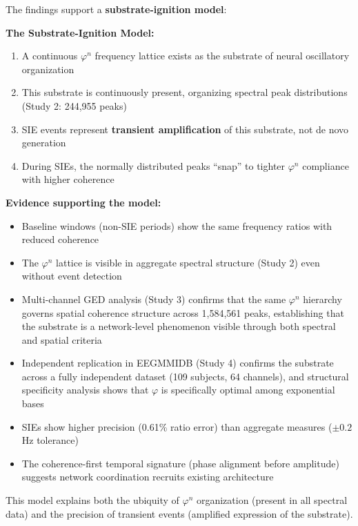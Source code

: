 \documentclass[11pt,a4paper]{article}
\newcommand{\phisym}{\varphi}
\begin{document}
The findings support a \textbf{substrate-ignition model}:

\begin{keyinsight}
\textbf{The Substrate-Ignition Model:}
\begin{enumerate}
    \item A continuous $\phisym^n$ frequency lattice exists as the substrate of neural oscillatory organization
    \item This substrate is continuously present, organizing spectral peak distributions (Study 2: 244,955 peaks)
    \item SIE events represent \textbf{transient amplification} of this substrate, not de novo generation
    \item During SIEs, the normally distributed peaks ``snap'' to tighter $\phisym^n$ compliance with higher coherence
\end{enumerate}
\end{keyinsight}

\textbf{Evidence supporting the model:}
\begin{itemize}
    \item Baseline windows (non-SIE periods) show the same frequency ratios with reduced coherence
    \item The $\phisym^n$ lattice is visible in aggregate spectral structure (Study 2) even without event detection
    \item Multi-channel GED analysis (Study 3) confirms that the same $\phisym^n$ hierarchy governs spatial coherence structure across 1,584,561 peaks, establishing that the substrate is a network-level phenomenon visible through both spectral and spatial criteria
    \item Independent replication in EEGMMIDB (Study 4) confirms the substrate across a fully independent dataset (109 subjects, 64 channels), and structural specificity analysis shows that $\phisym$ is specifically optimal among exponential bases
    \item SIEs show higher precision (0.61\% ratio error) than aggregate measures ($\pm 0.2$ Hz tolerance)
    \item The coherence-first temporal signature (phase alignment before amplitude) suggests network coordination recruits existing architecture
\end{itemize}

This model explains both the ubiquity of $\phisym^n$ organization (present in all spectral data) and the precision of transient events (amplified expression of the substrate).
\end{document}
